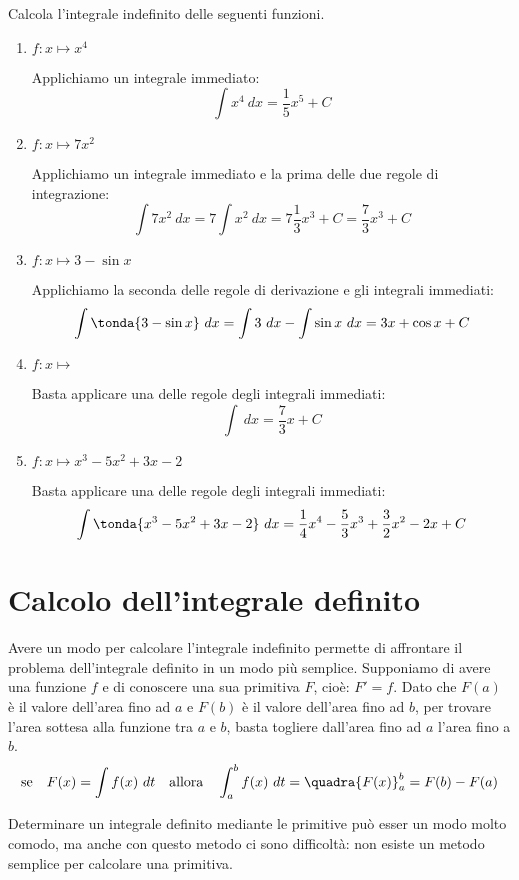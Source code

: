 \begin{esempio}
Calcola l'integrale indefinito delle seguenti funzioni.
\begin{enumerate}
\item \(f: x \mapsto x^4\)

Applichiamo un integrale immediato:
\[\int x^4~dx = \dfrac{1}{5}x^5 +C\]
\item \(f: x \mapsto 7x^2\)

Applichiamo un integrale immediato e la prima delle due regole di 
integrazione:
\[\int 7x^2~dx = 7\int x^2~dx = 7 \dfrac{1}{3}x^3 +C= \dfrac{7}{3}x^3 +C\]
\item \(f: x \mapsto 3 -\sin x\)

Applichiamo la seconda delle regole di derivazione e gli integrali immediati:
\[\int \tonda{3 -\sin x}~dx = \int 3~dx - \int \sin x~dx = 3x +\cos x +C\]
\item \(f: x \mapsto \)

Basta applicare una delle regole degli integrali immediati:
\[\int ~dx = \dfrac{7}{3}x +C\]
\item \(f: x \mapsto x^3 -5x^2 +3x -2\)

Basta applicare una delle regole degli integrali immediati:
\[\int \tonda{x^3 -5x^2 +3x -2}~dx = 
\dfrac{1}{4}x^4 -\dfrac{5}{3}x^3 +\dfrac{3}{2}x^2 -2x +C\]
\end{enumerate}
\end{esempio}


\section{Calcolo dell'integrale definito}
\label{sec:integrali_indefiniti}

Avere un modo per calcolare l'integrale indefinito permette di affrontare il 
problema dell'integrale definito in un modo più semplice.
Supponiamo di avere una funzione \(f\) e di conoscere una sua primitiva 
\(F\), cioè: \(F' = f\).
Dato che \(F(a)\) è il valore dell'area fino ad \(a\) e 
\(F(b)\) è il valore dell'area fino ad \(b\), 
per trovare l'area sottesa alla funzione tra \(a\) e \(b\),
basta togliere dall'area fino ad \(a\) l'area fino a \(b\).
\[\text{se} \quad F(x) = \int f(x)~dt \quad \text{allora} \quad 
\int_a^b f(x)~dt = \quadra{F(x)}_a^b = F(b) - F(a)\]

Determinare un integrale definito mediante le primitive può esser un modo 
molto comodo, ma anche con questo metodo ci sono difficoltà: 
non esiste un metodo semplice per calcolare una primitiva.

